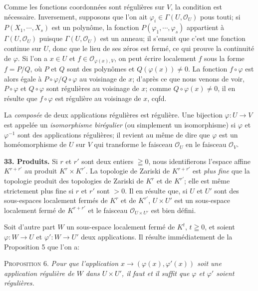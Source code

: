Comme les fonctions coordonnées sont régulières sur $V$, la condition est nécessaire. Inversement, supposons que l'on ait $\varphi_i \in \Gamma(U, \mathcal{O}_U)$ pous touti; si $P(X_1, \cdots, X_s)$ est un polynôme, la fonction $P(\varphi_1, \cdots, \varphi_s)$ appartient à $\Gamma(U, \mathcal{O}_U)$ puisque $\Gamma(U, \mathcal{O}_U)$ est un anneau; il s'ensuit que c'est une fonction continue sur $U$, donc que le lieu de ses zéros est fermé, ce qui prouve la continuité de $\varphi$. Si l'on a $x \in U$ et $f \in \mathcal{O}_{\varphi(x),V}$, on peut écrire localement $f$ sous la forme $f = P/Q$, où $P$ et $Q$ sont des polynômes et $Q(\varphi(x)) \neq 0$. La fonction $f \circ \varphi$ est alors égale à $P \circ \varphi/Q \circ \varphi$ au voisinage de $x$; d'après ce que nous venons de voir, $P \circ \varphi$ et $Q \circ \varphi$ sont régulières au voisinage de $x$; comme $Q \circ \varphi(x) \neq 0$, il en résulte que $f \circ \varphi$ est régulière au voisinage de $x$, cqfd.

La \textit{composée} de deux applications régulières est régulière. Une bijection $\varphi\colon U \to V$ est appelée un \textit{isomorphisme birégulier} (ou simplement un isomorphisme) si $\varphi$ et $\varphi^{-1}$ sont des applications régulières; il revient au même de dire que $\varphi$ est un homéomorphisme de $U$ sur $V$ qui transforme le faisceau $\mathcal{O}_U$ en le faisceau $\mathcal{O}_V$.

\textbf{33. Produits.} Si $r$ et $r'$ sont deux entiers $\geqq 0$, nous identifierons l'espace affine $K^{r+r'}$ au produit $K^r \times K^{r'}$. La topologie de Zariski de $K^{r+r'}$ est \textit{plus fine} que la topologie produit des topologies de Zariski de $K^r$ et de $K^{r'}$; elle est même
strictement plus fine si $r$ et $r'$ sont $>0$. Il en résulte que, si $U$ et $U'$ sont des sous-espaces localement fermés de $K^r$ et de $K^{r'}$, $U \times U'$ est un sous-espace localement fermé de $K^{r+r'}$ et le faisceau $\mathcal{O}_{U \times U'}$ est bien défini.

Soit d'autre part $W$ un sous-espace localement fermé de $K^t$, $t \geqq 0$, et soient $\varphi\colon W \to U$ et $\varphi'\colon W \to U'$ deux applications. Il résulte immédiatement de la Proposition 5 que l'on a:

\textsc{Proposition 6.} \textit{Pour que l'application $x \to (\varphi(x), \varphi'(x))$ soit une application régulière de $W$ dans $U \times U'$, il faut et il suffit que $\varphi$ et $\varphi'$ soient régulières.}

